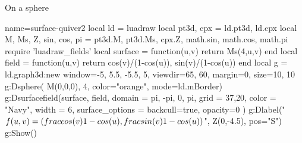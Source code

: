 \begin{demo}{On a sphere}
\begin{luadraw}{name=surface-quiver2}
local ld = luadraw
local pt3d, cpx = ld.pt3d, ld.cpx
local M, Ms, Z, sin, cos, pi = pt3d.M, pt3d.Ms, cpx.Z, math.sin, math.cos, math.pi
require 'luadraw_fields'
local surface = function(u,v) return Ms(4,u,v) end
local field = function(u,v) return {cos(v)/(1-cos(u)), sin(v)/(1-cos(u))} end
local g = ld.graph3d:new{ window={-5, 5.5, -5.5, 5}, viewdir={65, 60}, margin=0, size={10, 10} }
g:Dsphere( M(0,0,0), 4, {color="orange", mode=ld.mBorder})
g:Dsurfacefield(surface, field, {
    domain = {pi, -pi, 0, pi},
    grid = {37,20},
    color = "Navy",
    width = 6,
    surface_options = {backcull=true, opacity=0}
    })
g:Dlabel("$f(u,v)= (\\frac{\\cos(v)}{1-\\cos(u)},\\frac{\\sin(v)}{1-\\cos(u)})$", Z(0,-4.5), {pos="S"})
g:Show()
\end{luadraw}
\end{demo}

